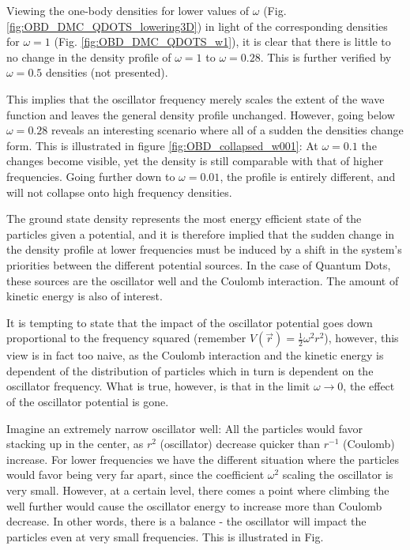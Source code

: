 Viewing the one-body densities for lower values of $\omega$ (Fig. \ref{fig:OBD_DMC_QDOTS_lowering3D}) in light of the corresponding densities for $\omega=1$ (Fig. \ref{fig:OBD_DMC_QDOTS_w1}), it is clear that there is little to no change in the density profile of $\omega=1$ to $\omega=0.28$. This is further verified by $\omega=0.5$ densities (not presented). 

This implies that the oscillator frequency merely scales the extent of the wave function and leaves the general density profile unchanged. However, going below $\omega=0.28$ reveals an interesting scenario where all of a sudden the densities change form. This is illustrated in figure \ref{fig:OBD_collapsed_w001}: At $\omega=0.1$ the changes become visible, yet the density is still comparable with that of higher frequencies. Going further down to $\omega=0.01$, the profile is entirely different, and will not collapse onto high frequency densities.

The ground state density represents the most energy efficient state of the particles given a potential, and it is therefore implied that the sudden change in the density profile at lower frequencies must be induced by a shift in the system's priorities between the different potential sources. In the case of Quantum Dots, these sources are the oscillator well and the Coulomb interaction. The amount of kinetic energy is also of interest.

It is tempting to state that the impact of the oscillator potential goes down proportional to the frequency squared (remember $V(\vec r) = \frac{1}{2}\omega^2r^2$), however, this view is in fact too naive, as the Coulomb interaction and the kinetic energy is dependent of the distribution of particles which in turn is dependent on the oscillator frequency. What is true, however, is that in the limit $\omega\to 0$, the effect of the oscillator potential is gone. 

Imagine an extremely narrow oscillator well: All the particles would favor stacking up in the center, as $r^2$ (oscillator) decrease quicker than $r^{-1}$ (Coulomb) increase. For lower frequencies we have the different situation where the particles would favor being very far apart, since the coefficient $\omega^2$ scaling the oscillator is very small. However, at a certain level, there comes a point where climbing the well further would cause the oscillator energy to increase more than Coulomb decrease. In other words, there is a balance - the oscillator will impact the particles even at very small frequencies. This is illustrated in Fig.

